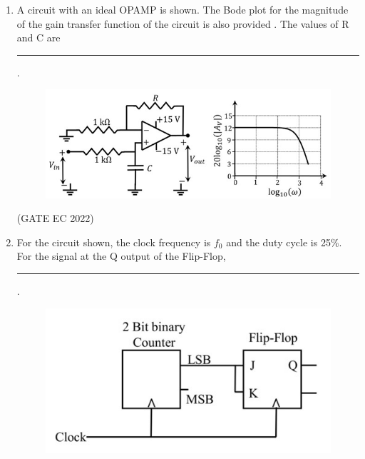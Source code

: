 \documentclass[journal,12pt,onecolumn]{IEEEtran}
\theoremstyle{remark}
\begin{document}
\begin{enumerate}
    \item A circuit with an ideal OPAMP is shown.  The Bode plot for the magnitude  of the gain transfer function  of the circuit is also provided . The values of R and C are \rule{2cm}{0.4pt}.
    \begin{figure}[H]
        \centering
        \includegraphics[width=\columnwidth]{figs/m20.jpg}
        \caption*{}
        \label{fig:m20}
    \end{figure}
    
    \hfill{(GATE EC 2022)}
    \begin{enumerate}
    \end{enumerate}

    \item For the circuit shown, the clock frequency is $f_0$ and the duty cycle is 25\%. For the signal at the Q output of the Flip-Flop, \rule{2cm}{0.4pt}.
    \begin{figure}[H]
        \centering
        \includegraphics[width=0.5\columnwidth]{figs/m21.jpg}
        \caption*{}
        \label{fig:m21}
    \end{figure}
    

\end{enumerate}
\end{document}
